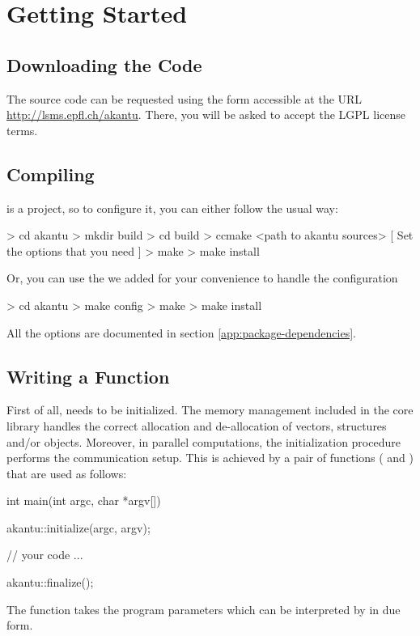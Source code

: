 \chapter{Getting Started}
\section{Downloading the Code}

The \akantu source code can be requested using the form accessible at the URL
\url{http://lsms.epfl.ch/akantu}.  There, you will be asked to accept the LGPL
license terms.

\section{Compiling \akantu}

\akantu is a  project, so to configure it, you can either
follow the usual way:
\begin{command}
  > cd akantu
  > mkdir build
  > cd build
  > ccmake <path to akantu sources>
  [ Set the options that you need ]
  > make
  > make install
\end{command}

\noindent Or, you can use the  we added for your
convenience to handle the  configuration

\begin{command}
  > cd akantu
  > make config
  > make
  > make install
\end{command}

\noindent All the \akantu options are documented in section
\vref{app:package-dependencies}.


\section{Writing a  Function\label{sect:common:main}}


First of all, \akantu needs to be initialized.  The memory management
included in the core library handles the correct allocation and
de-allocation of vectors, structures and/or objects. Moreover, in
parallel computations, the initialization procedure performs the
communication setup. This is achieved by a pair of functions
( and ) that are used as follows:

\begin{cpp}
int main(int argc, char *argv[])
{
  akantu::initialize(argc, argv);

  // your code
  ...

  akantu::finalize();
}
\end{cpp}
The  function takes the program parameters which
can be interpreted by \akantu in due form.


